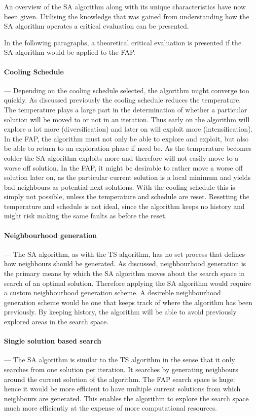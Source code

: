 An overview of the SA algorithm along with its unique characteristics have now been given. Utilising the knowledge that was gained from understanding how the SA algorithm operates a critical evaluation can be presented. 

In the following paragraphs, a theoretical critical evaluation is presented if the SA algorithm would be applied to the FAP.

\paragraph{Cooling Schedule}
--- Depending on the cooling schedule selected, the algorithm might converge too quickly. As discussed previously the cooling schedule reduces the temperature. The temperature plays a large part in the determination of whether a particular solution will be moved to or not in an iteration. Thus early on the algorithm will explore a lot more (diversification) and later on will exploit more (intensification). In the FAP, the algorithm must not only be able to explore and exploit, but also be able to return to an exploration phase if need be.
As the temperature becomes colder the SA algorithm exploits more and therefore will not easily move to a worse off solution. In the FAP, it might be desirable to rather move a worse off solution later on, as the particular current solution is a local minimum and yields bad neighbours as potential next solutions. With the cooling schedule this is simply not possible, unless the temperature and schedule are reset. Resetting the temperature and schedule is not ideal, since the algorithm keeps no history and might risk making the same faults as before the reset.
\paragraph{Neighbourhood generation}
--- The SA algorithm, as with the TS algorithm, has no set process that defines how neighbours should be generated. As discussed, neighbourhood generation is the primary means by which the SA algorithm moves about the search space in search of an optimal solution. Therefore applying the SA algorithm would require a custom neighbourhood generation scheme. A desireble neighbourhood generation scheme would be one that keeps track of where the algorithm has been previously. By keeping history, the algorithm will be able to avoid previously explored areas in the search space.
\paragraph{Single solution based search}
--- The SA algorithm is similar to the TS algorithm in the sense that it only searches from one solution per iteration. It searches by generating neighbours around the current solution of the algorithm. The FAP search space is huge; hence it would be more efficient to have multiple current solutions from which neighbours are generated. This enables the algorithm to explore the search space much more efficiently at the expense of more computational resources.

